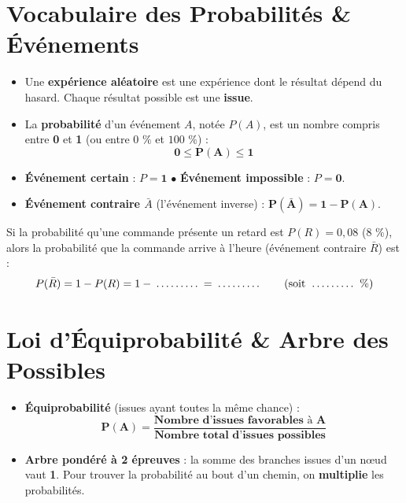 \section{Vocabulaire des Probabilités \& Événements}

\begin{cadredef}
\begin{itemize}[leftmargin=1.5em, itemsep=2pt]
    \item Une \textbf{expérience aléatoire} est une expérience dont le résultat dépend du hasard. Chaque résultat possible est une \textbf{issue}.
    \item La \textbf{probabilité} d'un événement $A$, notée $P(A)$, est un nombre compris entre \textbf{0} et \textbf{1} (ou entre $0\text{ \%}$ et $100\text{ \%}$) :
    \[ \mathbf{0 \le P(A) \le 1} \]
    \item \textbf{Événement certain} : $P = \mathbf{1}$ \quad $\bullet$ \quad \textbf{Événement impossible} : $P = \mathbf{0}$.
    \item \textbf{Événement contraire $\bar{A}$} (l'événement inverse) : $\mathbf{P(\bar{A}) = 1 - P(A)}$.
\end{itemize}
\end{cadredef}

\begin{cadreexemple}
Si la probabilité qu'une commande présente un retard est $P(R) = 0{,}08$ ($8\text{ \%}$), alors la probabilité que la commande arrive à l'heure (événement contraire $\bar{R}$) est :
\[ P(\bar{R}) = 1 - P(R) = 1 - \pointille[1.5cm] = \pointille[1.5cm] \qquad (\text{soit } \pointille[1.5cm]\text{ \%}) \]
\end{cadreexemple}

\section{Loi d'Équiprobabilité \& Arbre des Possibles}

\begin{cadredef}
\begin{itemize}[leftmargin=1.5em, itemsep=2pt]
    \item \textbf{Équiprobabilité} (issues ayant toutes la même chance) :
    \[ \mathbf{P(A) = \frac{\text{Nombre d'issues favorables à } A}{\text{Nombre total d'issues possibles}}} \]
    \item \textbf{Arbre pondéré à 2 épreuves} : la somme des branches issues d'un n\oe ud vaut \textbf{1}. Pour trouver la probabilité au bout d'un chemin, on \textbf{multiplie} les probabilités.
\end{itemize}
\end{cadredef}


